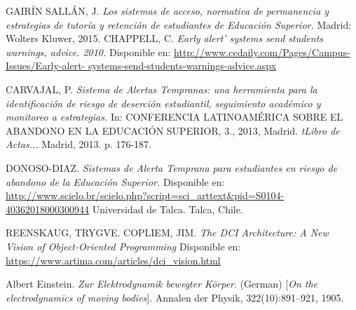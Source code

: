 
\begin{thebibliography}{}


GAIRÍN SALLÁN, J.
\textit{Los sistemas de acceso, normativa de permanencia y estrategias de tutoría y retención de estudiantes de Educación Superior.} Madrid: Wolters Kluwer, 2015.
CHAPPELL, C. 
\textit{Early alert’ systems send students warnings, advice. 2010.} Disponible en: \url{http://www.ccdaily.com/Pages/Campus-Issues/Early-alert- systems-send-students-warnings-advice.aspx}

CARVAJAL, P.
\textit{Sistema de Alertas Tempranas: una herramienta para la identificación de riesgo de deserción estudiantil, seguimiento académico y monitoreo a estrategias.} In: CONFERENCIA LATINOAMÉRICA SOBRE EL ABANDONO EN LA EDUCACIÓN SUPERIOR, 3., 2013, Madrid. \textit{tLibro de Actas...} Madrid, 2013. p. 176-187.

DONOSO-DIAZ.
\textit{Sistemas de Alerta Temprana para estudiantes en riesgo de abandono de la Educación Superior.}
Disponible en:
\url{http://www.scielo.br/scielo.php?script=sci\_arttext&pid=S0104-40362018000300944}
Universidad de Talca. Talca, Chile.

 REENSKAUG, TRYGVE.
 COPLIEM, JIM.
\textit{The DCI Architecture: A New Vision of Object-Oriented Programming}
Disponible en:
\url{https://www.artima.com/articles/dci_vision.html}




Albert Einstein. 
\textit{Zur Elektrodynamik bewegter K{\"o}rper}. (German) 
[\textit{On the electrodynamics of moving bodies}]. 
Annalen der Physik, 322(10):891–921, 1905.

\end{thebibliography}